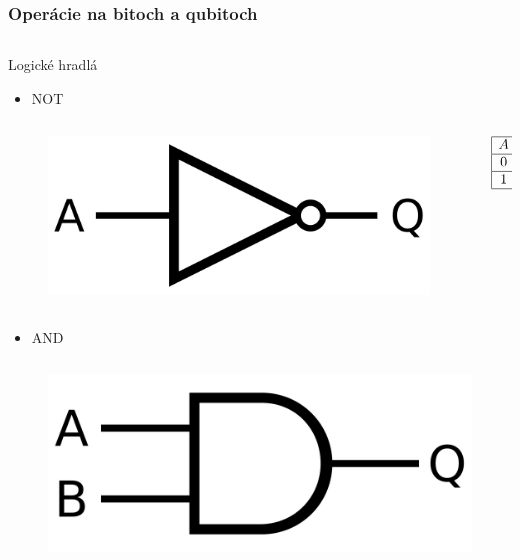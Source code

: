 \documentclass{beamer}
\begin{document}
\begin{frame}
	\frametitle{Operácie na bitoch a qubitoch}
	\begin{columns}[t]
		\begin{column}{.5\textwidth}
			\centering
			Logické hradlá
			\vspace{0.4cm}
			\begin{itemize}
				\item NOT
			\end{itemize}
						     
			\begin{columns}[c]
				\begin{column}{.5\textwidth}
					\begin{figure}
						\includegraphics[width=.5\textwidth]{standard_not_gate.png}            
					\end{figure}
				\end{column}
				\begin{column}{.5\textwidth}
					\begin{displaymath}
						\begin{array}{|c|c|}
							\hline
							A & Q \\
							\hline
							0 & 1 \\
							\hline
							1 & 0 \\
							\hline
						\end{array}   
					\end{displaymath}    
				\end{column}
			\end{columns}
			\begin{itemize}
				\item AND
			\end{itemize}
			\begin{columns}[c]
				\begin{column}{.5\textwidth}
					\begin{figure}
						\includegraphics[width=.5\textwidth]{standard_and_gate.png}            

\end{figure}
\end{column}
\end{columns}
\end{column}
\end{columns}
\end{frame}
\end{document}
